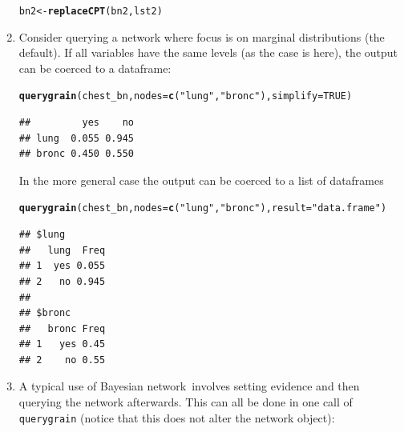 \documentclass[10pt]{article}\usepackage[]{graphicx}\usepackage[]{xcolor}
\makeatletter
\newcommand{\hlnum}[1]{\textcolor[rgb]{0.686,0.059,0.569}{#1}}%
\newcommand{\hlstr}[1]{\textcolor[rgb]{0.192,0.494,0.8}{#1}}%
\newcommand{\hlstd}[1]{\textcolor[rgb]{0.345,0.345,0.345}{#1}}%
\newcommand{\hlkwb}[1]{\textcolor[rgb]{0.69,0.353,0.396}{#1}}%
\newcommand{\hlkwc}[1]{\textcolor[rgb]{0.333,0.667,0.333}{#1}}%
\newcommand{\hlkwd}[1]{\textcolor[rgb]{0.737,0.353,0.396}{\textbf{#1}}}%
\newenvironment{kframe}{%
 \def\at@end@of@kframe{}%
 \ifinner\ifhmode%
  \def\at@end@of@kframe{\end{minipage}}%
  \begin{minipage}{\columnwidth}%
 \fi\fi%
 \def\FrameCommand##1{\hskip\@totalleftmargin \hskip-\fboxsep
 \colorbox{shadecolor}{##1}\hskip-\fboxsep
     \hskip-\linewidth \hskip-\@totalleftmargin \hskip\columnwidth}%
 \MakeFramed {\advance\hsize-\width
   \@totalleftmargin\z@ \linewidth\hsize
   \@setminipage}}%
 {\par\unskip\endMakeFramed%
 \at@end@of@kframe}
\newenvironment{knitrout}{}{} %
\def\code#1{{\texttt{#1}}}
\def\bn{Bayesian network}
\makeatother
\begin{document}
\begin{enumerate}
\begin{knitrout}
\begin{kframe}
\begin{alltt}
\hlstd{bn2} \hlkwb{<-} \hlkwd{replaceCPT}\hlstd{(bn2, lst2)}
\end{alltt}
\end{kframe}
\end{knitrout}

\item Consider querying a network where focus is on 
  marginal distributions (the default). If all variables have the same
  levels (as the case is here), the output can be coerced to a
  dataframe:

\begin{knitrout}
\color{fgcolor}\begin{kframe}
\begin{alltt}
\hlkwd{querygrain}\hlstd{(chest_bn,} \hlkwc{nodes}\hlstd{=}\hlkwd{c}\hlstd{(}\hlstr{"lung"}\hlstd{,} \hlstr{"bronc"}\hlstd{),} \hlkwc{simplify} \hlstd{=} \hlnum{TRUE}\hlstd{)}
\end{alltt}
\begin{verbatim}
##         yes    no
## lung  0.055 0.945
## bronc 0.450 0.550
\end{verbatim}
\end{kframe}
\end{knitrout}

In the more general case the output can be coerced to a list of dataframes
\begin{knitrout}
\color{fgcolor}\begin{kframe}
\begin{alltt}
\hlkwd{querygrain}\hlstd{(chest_bn,} \hlkwc{nodes}\hlstd{=}\hlkwd{c}\hlstd{(}\hlstr{"lung"}\hlstd{,} \hlstr{"bronc"}\hlstd{),} \hlkwc{result}\hlstd{=}\hlstr{"data.frame"}\hlstd{)}
\end{alltt}
\begin{verbatim}
## $lung
##   lung  Freq
## 1  yes 0.055
## 2   no 0.945
## 
## $bronc
##   bronc Freq
## 1   yes 0.45
## 2    no 0.55
\end{verbatim}
\end{kframe}
\end{knitrout}

\item A typical use of \bn\ involves setting evidence and then
  querying the network afterwards. This can all be done in one call of
  \code{querygrain} (notice that this does not alter the network object):


\end{enumerate}
\end{document}
